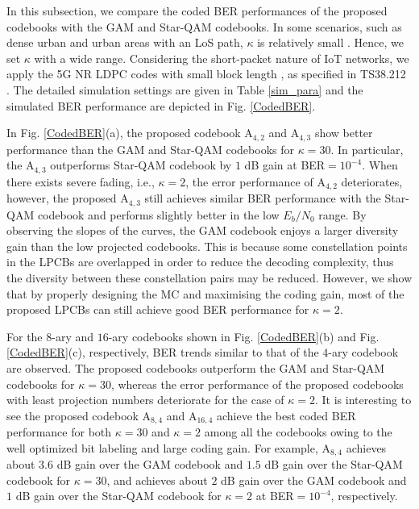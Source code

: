 \documentclass[journal]{IEEEtran}
\begin{document}
In this subsection, we compare the coded BER performances of the    proposed codebooks with the GAM   and Star-QAM codebooks.  In some scenarios, such as   dense urban and urban areas with an LoS path,      $\kappa$ is relatively small \cite{5G_NR_s_iot, lutz1991land, vucetic1992channel}. Hence, we set  $\kappa$ with a wide range. Considering  the short-packet nature of IoT networks, we apply the 5G NR LDPC codes with small block length \cite{liu2021sparse,PerturbedDeng}, as specified in TS38.212 \cite{5G_NR}.  The detailed simulation settings are  given in Table \ref{sim_para} and the simulated   BER performance   are depicted in Fig. \ref{CodedBER}.

In Fig. \ref{CodedBER}(a), the proposed codebook $\text{A}_{4,2}$ and  $\text{A}_{4,3}$  show  better performance than the GAM and Star-QAM codebooks for $\kappa = 30$. In particular, the  $\text{A}_{4,3}$ outperforms Star-QAM codebook by $1$ dB gain at BER$=10^{-4}$. When there exists severe fading, i.e., $\kappa =2$, the error performance  of $\text{A}_{4,2}$ deteriorates, however, the  proposed $\text{A}_{4,3}$ still achieves similar BER performance with the Star-QAM codebook and performs  slightly better in the low $E_b/N_0$ range. By observing the slopes   of the curves, the GAM codebook enjoys a larger   diversity gain than the low projected codebooks.  This is because some constellation points in the LPCBs are overlapped in order to reduce the decoding complexity, thus the diversity between these constellation pairs may be reduced.   However, we show that by properly designing the MC and maximising the coding gain, most of the proposed LPCBs  can still achieve good   BER performance for $\kappa =2$.   


For the    $8$-ary and $16$-ary  codebooks shown in Fig.  \ref{CodedBER}(b) and Fig.  \ref{CodedBER}(c), respectively, BER trends similar to that of the $4$-ary codebook are observed.   The proposed   codebooks outperform  the GAM  and Star-QAM codebooks for  $\kappa=30$, whereas the error  performance of the  proposed codebooks with   least projection numbers  deteriorate  for the case of $\kappa =2$.  
It is interesting to  see the proposed codebook $\text{A}_{8,4}$ and $\text{A}_{16,4}$ achieve the best coded BER performance for both  $\kappa=30$ and  $\kappa=2$ among all the codebooks owing to the well optimized bit labeling   and large coding gain. For example, $\text{A}_{8,4}$ achieves about $3.6$ dB gain over the GAM codebook and $1.5$ dB gain over the Star-QAM  codebook for $\kappa=30$,  and   achieves about $2$ dB gain over the GAM codebook and $1$ dB gain over the Star-QAM  codebook for $\kappa=2$ at BER$=10^{-4}$, respectively.
 
\end{document}
